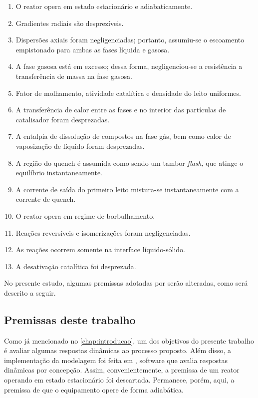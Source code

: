 \begin{enumerate}
  \item O reator opera em estado estacionário e adiabaticamente.
  \item Gradientes radiais são desprezíveis.
  \item Dispersões axiais foram negligenciadas; portanto, assumiu-se o
  escoamento empistonado para ambas as fases líquida e gasosa.
  \item A fase gasosa está em excesso; dessa forma, negligenciou-se a
  resistência a transferência de massa na fase gasosa.
  \item Fator de molhamento, atividade catalítica e densidade do leito
  uniformes.
  \item A transferência de calor entre as fases e no interior das partículas de
  catalisador foram desprezadas.
  \item A entalpia de dissolução de compostos na fase gás, bem como calor de
  vaposização de líquido foram desprezadas.
  \item A região do quench é assumida como sendo um tambor \emph{flash}, que atinge o
  equilíbrio instantaneamente.
  \item A corrente de saída do primeiro leito mistura-se instantaneamente com a
  corrente de quench.
  \item O reator opera em regime de borbulhamento.
  \item Reações reversíveis e isomerizações foram negligenciadas.
  \item As reações ocorrem somente na interface líquido-sólido.
  \item A desativação catalítica foi desprezada.
\end{enumerate}

No presente estudo, algumas premissas adotadas por  serão
alteradas, como será descrito a seguir. 

\subsection{Premissas deste trabalho} \label{sec:premissasdestetrabalho}

Como já mencionado no \autoref{chap:introducao}, um dos objetivos do presente
trabalho é avaliar algumas respostas dinâmicas ao processo proposto. Além disso,
a implementação da modelagem foi feita em \emso, software que avalia respostas
dinâmicas por concepção. Assim, convenientemente, a premissa de um reator
operando em estado estacionário foi descartada. Permanece, porém, aqui, a
premissa de que o equipamento opere de forma adiabática.

